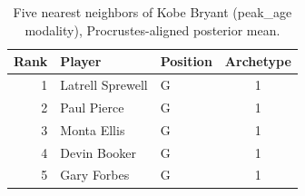 \begin{table}[htbp]
  \centering\small
  \begin{tabular}{rllc}
    \toprule
    Rank & Player & Position & Archetype \\
    \midrule
    1 & Latrell Sprewell & G & 1 \\
    2 & Paul Pierce & G & 1 \\
    3 & Monta Ellis & G & 1 \\
    4 & Devin Booker & G & 1 \\
    5 & Gary Forbes & G & 1 \\
    \bottomrule
  \end{tabular}
  \caption{Five nearest neighbors of Kobe Bryant (peak_age modality), Procrustes-aligned posterior mean.}
  \label{tab:Kobe_Bryant_neighbors_peak_age}
\end{table}

